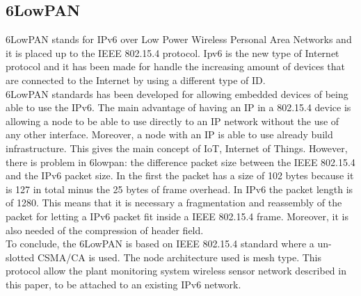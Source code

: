 \subsection{6LowPAN}
6LowPAN stands for IPv6 over Low Power Wireless Personal Area Networks and it is placed up to the IEEE 802.15.4 protocol. Ipv6 is the new type of Internet protocol and it has been made for handle the increasing amount of devices that are connected to the Internet by using a different type of ID.\cite{6lowpan}\\
6LowPAN standards has been developed for allowing embedded devices of being able to use the IPv6.\cite{why}
The main advantage of having an IP in a 802.15.4 device is allowing a node to be able to use directly to an IP network without the use of any other interface. Moreover, a node with an IP is able to use already build infrastructure.\cite{6lowpan} This gives the main concept of IoT, Internet of Things. 
However, there is  problem in 6lowpan: the difference packet size between the IEEE 802.15.4 and the IPv6 packet size. In the first the packet has a size of 102 bytes because it is 127 in total minus the 25 bytes of frame overhead. In IPv6 the packet length is of 1280. This means that it is necessary a fragmentation and reassembly of the packet for letting a IPv6 packet fit inside a IEEE 802.15.4 frame. Moreover, it is also needed of the compression of header field.\cite{slide} \cite{6lowpan}\\
To conclude, the 6LowPAN is based on IEEE 802.15.4 standard where a un-slotted CSMA/CA is used. The node architecture used is mesh type. \cite{6lowpan}
This protocol allow the plant monitoring system wireless sensor network described in this paper, to be attached to an existing IPv6 network.